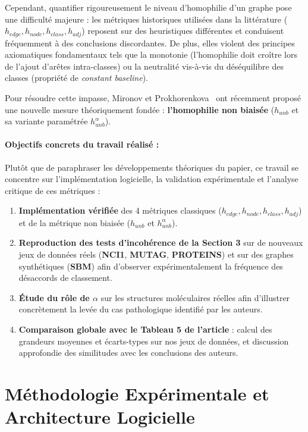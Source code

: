 \documentclass[11pt,a4paper]{article}
\begin{document}
Cependant, quantifier rigoureusement le niveau d'homophilie d'un graphe pose une difficulté majeure : les métriques historiques utilisées dans la littérature ($h_{edge}, h_{node}, h_{class}, h_{adj}$) reposent sur des heuristiques différentes et conduisent fréquemment à des conclusions discordantes. De plus, elles violent des principes axiomatiques fondamentaux tels que la monotonie (l'homophilie doit croître lors de l'ajout d'arêtes intra-classes) ou la neutralité vis-à-vis du déséquilibre des classes (propriété de \textit{constant baseline}). 

Pour résoudre cette impasse, Mironov et Prokhorenkova~\cite{mironov2024revisiting} ont récemment proposé une nouvelle mesure théoriquement fondée : \textbf{l'homophilie non biaisée} ($h_{unb}$ et sa variante paramétrée $h_{unb}^\alpha$).

\paragraph{Objectifs concrets du travail réalisé :}
Plutôt que de paraphraser les développements théoriques du papier, ce travail se concentre sur l'implémentation logicielle, la validation expérimentale et l'analyse critique de ces métriques :
\begin{enumerate}[leftmargin=1.5em]
    \item \textbf{Implémentation vérifiée} des 4 métriques classiques ($h_{edge}, h_{node}, h_{class}, h_{adj}$) et de la métrique non biaisée ($h_{unb}$ et $h_{unb}^\alpha$).
    \item \textbf{Reproduction des tests d'incohérence de la Section 3} sur de nouveaux jeux de données réels (\textbf{NCI1}, \textbf{MUTAG}, \textbf{PROTEINS}) et sur des graphes synthétiques (\textbf{SBM}) afin d'observer expérimentalement la fréquence des désaccords de classement.
    \item \textbf{Étude du rôle de $\alpha$} sur les structures moléculaires réelles afin d'illustrer concrètement la levée du cas pathologique identifié par les auteurs.
    \item \textbf{Comparaison globale avec le Tableau 5 de l'article} : calcul des grandeurs moyennes et écarts-types sur nos jeux de données, et discussion approfondie des similitudes avec les conclusions des auteurs.
\end{enumerate}

\section{Méthodologie Expérimentale et Architecture Logicielle}
\end{document}
